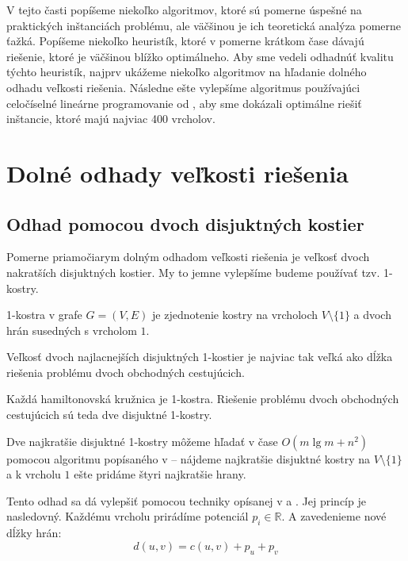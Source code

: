 
V tejto časti popíšeme niekoľko algoritmov, ktoré sú pomerne úspešné
na praktických inštanciách problému, ale väčšinou je ich teoretická
analýza pomerne ťažká. Popíšeme niekoľko heuristík, ktoré v pomerne krátkom čase
dávajú riešenie, ktoré je väčšinou blížko optimálneho. Aby sme vedeli odhadnúť
kvalitu týchto heuristík, najprv ukážeme niekoľko algoritmov na hľadanie dolného odhadu
veľkosti riešenia. Následne ešte vylepšíme algoritmus používajúci
celočíselné lineárne programovanie od \cite{duchenne}, aby
sme dokázali optimálne riešiť inštancie, ktoré majú najviac 400 vrcholov.

\section{Dolné odhady veľkosti riešenia}

\subsection{Odhad pomocou dvoch disjuktných kostier}

Pomerne priamočiarym dolným odhadom veľkosti riešenia je veľkosť
dvoch nakratších disjuktných kostier. My to jemne vylepšíme budeme používať
tzv. 1-kostry.

\begin{definicia}
1-kostra v grafe $G=(V, E)$ je zjednotenie kostry na vrcholoch $V \setminus \{1\}$
a dvoch hrán susedných s vrcholom $1$. 
\end{definicia}

\begin{lema}
Veľkosť dvoch najlacnejších disjuktných 1-kostier je najviac tak veľká ako dĺžka
riešenia problému dvoch obchodných cestujúcich.
\end{lema}

\begin{dokaz}
Každá hamiltonovská kružnica je 1-kostra. Riešenie problému dvoch obchodných cestujúcich
sú teda dve disjuktné 1-kostry.
\end{dokaz}

Dve najkratšie disjuktné 1-kostry môžeme hľadať v čase $O(m \lg m + n^2)$ pomocou algoritmu popísaného v
\cite{spanning2} -- nájdeme najkratšie disjuktné kostry na $V \setminus \{1\}$ a k vrcholu $1$ ešte
pridáme štyri najkratšie hrany.

Tento odhad sa dá vylepšiť pomocou techniky opísanej v \cite{heldtsp} a \cite{lower1}.
Jej princíp je nasledovný. Každému vrcholu prirádíme potenciál 
$p_i \in \mathbb{R}$.
A zavedenieme nové dĺžky hrán:
$$d(u, v) = c(u, v) + p_u + p_v$$

